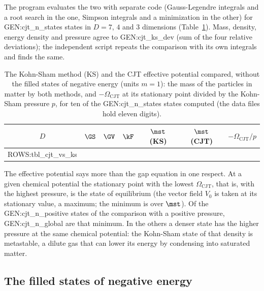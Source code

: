 The program evaluates the two with separate code (Gauss-Legendre integrals and a root search in the
one, Simpson integrals and a minimization in the other) for {{GEN:cjt_n_states}} states in $D=7$,
$4$ and $3$ dimensions (Table~\ref{tab:cjtks}). Mass, density, energy density and pressure agree to
{{GEN:cjt_ks_dev}} (sum of the four relative deviations); the independent script repeats the
comparison with its own integrals and finds the same.

\begin{table}
\caption{\label{tab:cjtks}The Kohn-Sham method (KS) and the CJT effective potential compared, without
the filled states of negative energy (units $m=1$): the mass of the particles in matter by both
methods, and $-\Omega_{\mathrm{CJT}}$ at its stationary point divided by the Kohn-Sham pressure $p$,
for ten of the {{GEN:cjt_n_states}} states computed (the data files hold eleven digits).}
\begin{ruledtabular}
\begin{tabular}{ccccccc}
$D$ & $\GS$ & $\GV$ & $\kF$ & $\mst$ (KS) & $\mst$ (CJT) & $-\Omega_{\mathrm{CJT}}/p$ \\
\hline
{{ROWS:tbl_cjt_vs_ks}}
\end{tabular}
\end{ruledtabular}
\end{table}

The effective potential says more than the gap equation in one respect. At a given chemical
potential the stationary point with the lowest $\Omega_{\mathrm{CJT}}$, that is, with the highest
pressure, is the state of equilibrium (the vector field $V_0$ is taken at its stationary value, a
maximum; the minimum is over $\mst$). Of the {{GEN:cjt_n_positive}} states of the comparison with a
positive pressure, {{GEN:cjt_n_global}} are that minimum. In the others a denser state has the higher
pressure at the same chemical potential: the Kohn-Sham state of that density is metastable, a dilute
gas that can lower its energy by condensing into saturated matter.

\subsection{The filled states of negative energy}
\label{sec:sea}

